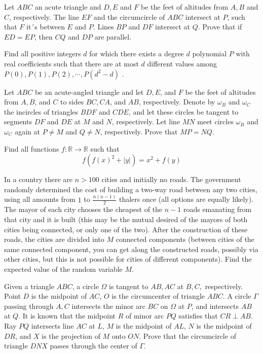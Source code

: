 \documentclass[11pt]{scrartcl}
\begin{document}
\begin{problem}[7412933249652771804]
Let $ABC$ an acute triangle and $D,E$ and $F$ be the feet of altitudes from $A,B$ and $C$, respectively. The line $EF$ and the circumcircle of $ABC$ intersect at $P$, such that $F$ it´s between $E$ and $P$. Lines $BP$ and $DF$ intersect at $Q$. Prove that if $ED=EP$, then $CQ$ and $DP$ are parallel.
\end{problem}
\begin{problem}[7583686967751031247]
	Find all positive integers $d$ for which there exists a degree $d$ polynomial $P$ with real coefficients such that there are at most $d$ different values among $P(0),P(1),P(2),\cdots,P(d^2-d)$ .
\end{problem}
\begin{problem}[57940096937913]
Let $ABC$ be an acute-angled triangle and let $D, E$, and $F$ be the feet of altitudes from $A, B$, and $C$ to sides $BC, CA$, and $AB$, respectively. Denote by $\omega_B$ and $\omega_C$ the incircles of triangles $BDF$ and $CDE$, and let these circles be tangent to segments $DF$ and $DE$ at $M$ and $N$, respectively. Let line $MN$ meet circles $\omega_B$ and $\omega_C$ again at $P \ne M$ and $Q \ne N$, respectively. Prove that $MP = NQ$.
\end{problem}
\begin{problem}[514210607042538]
Find all functions $f : \mathbb{R} \to \mathbb{R}$ such that
$$f(f(x)^2 + |y|) = x^2 + f(y)$$
\end{problem}
\begin{problem}[4118541811915047639]
	In a country there are $n>100$ cities and initially no roads. The government randomly determined the cost of building a two-way road between any two cities, using all amounts from $1$ to $\frac{n(n-1)}{2}$ thalers once (all options are equally likely). The mayor of each city chooses the cheapest of the $n-1$ roads emanating from that city and it is built (this may be the mutual desired of the mayors of both cities being connected, or only one of the two).
After the construction of these roads, the cities are divided into $M$ connected components (between cities of the same connected component, you can get along the constructed roads, possibly via other cities, but this is not possible for cities of different components). Find the expected value of the random variable $M$.
\end{problem}
\begin{problem}[1222382895728709073]
	Given a triangle $ABC$, a circle $\Omega$ is tangent to $AB,AC$ at $B,C,$ respectively. Point $D$ is the midpoint of $AC$, $O$ is the circumcenter of triangle $ABC$. A circle $\Gamma$ passing through $A,C$ intersects the minor arc $BC$ on $\Omega$ at $P$, and intersects $AB$ at $Q$. It is known that the midpoint $R$ of minor arc $PQ$ satisfies that $CR \perp AB$. Ray $PQ$ intersects line $AC$ at $L$, $M$ is the midpoint of $AL$, $N$ is the midpoint of $DR$, and $X$ is the projection of $M$ onto $ON$. Prove that the circumcircle of triangle $DNX$ passes through the center of $\Gamma$.
\end{problem}
\end{document}

